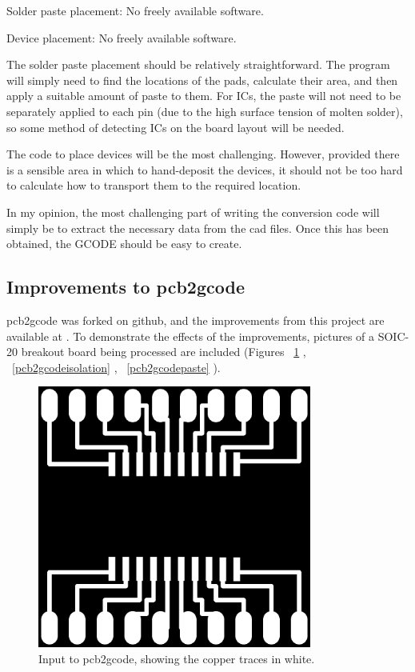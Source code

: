 Solder paste placement: No freely available software.

Device placement: No freely available software.

The solder paste placement should be relatively straightforward. The program will simply need to find the locations of the pads, calculate their
area, and then apply a suitable amount of paste to them. For ICs, the paste will not need to be separately applied to each pin (due to the high
surface tension of molten solder), so some method of detecting ICs on the board layout will be needed.

The code to place devices will be the most challenging. However, provided there is a sensible area in which to hand-deposit the devices, it should
not be too hard to calculate how to transport them to the required location.

In my opinion, the most challenging part of writing the conversion code will simply be to extract the necessary data from the cad files. Once this
has been obtained, the GCODE should be easy to create.

\subsection{Improvements to pcb2gcode}
pcb2gcode was forked on github, and the improvements from this project are available at \cite{github}.
To demonstrate the effects of the improvements, pictures of a SOIC-20 breakout board being processed are included (Figures ~\ref{pcb2gcodeinput} , ~\ref{pcb2gcodeisolation} , ~\ref{pcb2gcodepaste} ).

\begin{figure}[ht!]
\centering
\includegraphics[width=90mm]{resources/breakout_copper.png}
\caption{Input to pcb2gcode, showing the copper traces in white.}
\label{pcb2gcodeinput}
\end{figure}

